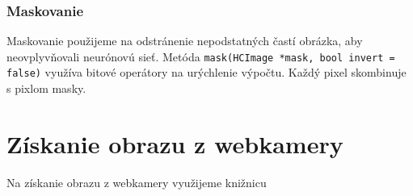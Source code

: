 \subsubsection{Maskovanie}
Maskovanie použijeme na odstránenie nepodstatných častí obrázka, aby neovplyvňovali neurónovú sieť. Metóda {\tt mask(HCImage *mask, bool invert = false)} využíva bitové operátory na urýchlenie výpočtu. Každý pixel skombinuje s pixlom masky. 

\section{Získanie obrazu z webkamery}
Na získanie obrazu z webkamery využijeme knižnicu 